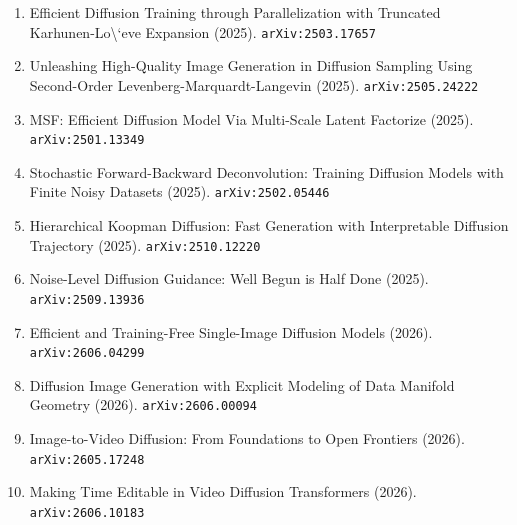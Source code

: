 \documentclass[11pt]{article}
\begin{document}
\begin{enumerate}
  \item Efficient Diffusion Training through Parallelization with Truncated Karhunen-Lo\textbackslash{}`eve Expansion (2025). \texttt{arXiv:2503.17657}
  \item Unleashing High-Quality Image Generation in Diffusion Sampling Using Second-Order Levenberg-Marquardt-Langevin (2025). \texttt{arXiv:2505.24222}
  \item MSF: Efficient Diffusion Model Via Multi-Scale Latent Factorize (2025). \texttt{arXiv:2501.13349}
  \item Stochastic Forward-Backward Deconvolution: Training Diffusion Models with Finite Noisy Datasets (2025). \texttt{arXiv:2502.05446}
  \item Hierarchical Koopman Diffusion: Fast Generation with Interpretable Diffusion Trajectory (2025). \texttt{arXiv:2510.12220}
  \item Noise-Level Diffusion Guidance: Well Begun is Half Done (2025). \texttt{arXiv:2509.13936}
  \item Efficient and Training-Free Single-Image Diffusion Models (2026). \texttt{arXiv:2606.04299}
  \item Diffusion Image Generation with Explicit Modeling of Data Manifold Geometry (2026). \texttt{arXiv:2606.00094}
  \item Image-to-Video Diffusion: From Foundations to Open Frontiers (2026). \texttt{arXiv:2605.17248}
  \item Making Time Editable in Video Diffusion Transformers (2026). \texttt{arXiv:2606.10183}
\end{enumerate}
\end{document}
